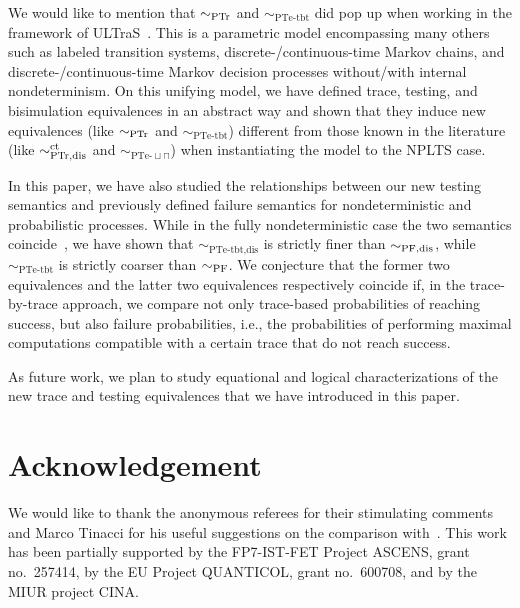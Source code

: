 \documentclass{LMCS}
\newcommand{\sbis}[1]
	{\sim_{#1}}
\newcommand{\ultras}
	{{\sc ULTraS}}
\begin{document}
We would like to mention that $\sbis{\rm PTr}$ and $\sbis{\textrm{PTe-tbt}}$ did pop up when working in the
framework of \ultras~\cite{BDL13a}. This is a parametric model encompassing many others such as labeled
transition systems, discrete-/continuous-time Markov chains, and discrete-/continuous-time Markov decision
processes without/with internal nondeterminism. On this unifying model, we have defined trace, testing, and
bisimulation equivalences in an abstract way and shown that they induce new equivalences (like $\sbis{\rm
PTr}$ and $\sbis{\textrm{PTe-tbt}}$) different from those known in the literature (like $\sbis{\rm
PTr,dis}^{\rm ct}$ and $\sbis{\textrm{PTe-}\sqcup\sqcap}$) when instantiating the model to the NPLTS case.

In this paper, we have also studied the relationships between our new testing semantics and previously
defined failure semantics for nondeterministic and probabilistic processes. While in the fully
nondeterministic case the two semantics coincide~\cite{DeN87}, we have shown that
$\sbis{\textrm{PTe-tbt,dis}}$ is strictly finer than $\sbis{\rm PF,dis}$, while $\sbis{\textrm{PTe-tbt}}$ is
strictly coarser than $\sbis{\rm PF}$. We conjecture that the former two equivalences and the latter two
equivalences respectively coincide if, in the trace-by-trace approach, we compare not only trace-based
probabilities of reaching success, but also failure probabilities, i.e., the probabilities of performing
maximal computations compatible with a certain trace that do not reach success.

As future work, we plan to study equational and logical characterizations of the new trace and testing
equivalences that we have introduced in this paper.



\section*{Acknowledgement}
We would like to thank the anonymous referees for their stimulating comments and Marco Tinacci for his
useful suggestions on the comparison with~\cite{GA12}. This work has been partially supported by the
FP7-IST-FET Project ASCENS, grant no.~257414, by the EU Project QUANTICOL, grant no.~600708, and by the MIUR
project CINA.






\vspace{-30 pt}
\end{document}
